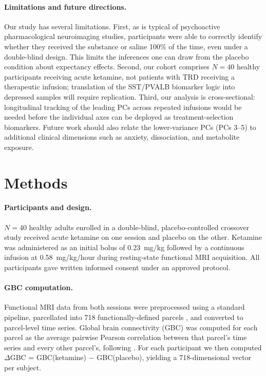 \documentclass[11pt]{article}
\begin{document}
\paragraph{Limitations and future directions.} Our study has several
limitations. First, as is typical of psychoactive pharmacological
neuroimaging studies, participants were able to correctly identify whether
they received the substance or saline 100\% of the time, even under a
double-blind design. This limits the inferences one can draw from the
placebo condition about expectancy effects. Second, our cohort comprises
$N=40$ healthy participants receiving acute ketamine, not patients with
TRD receiving a therapeutic infusion; translation of the SST/PVALB
biomarker logic into depressed samples will require replication. Third,
our analysis is cross-sectional: longitudinal tracking of the leading PCs
across repeated infusions would be needed before the individual axes can
be deployed as treatment-selection biomarkers. Future work should also
relate the lower-variance PCs (PCs 3--5) to additional clinical dimensions
such as anxiety, dissociation, and metabolite exposure.

\section{Methods}

\paragraph{Participants and design.} $N=40$ healthy adults enrolled in a
double-blind, placebo-controlled crossover study received acute ketamine
on one session and placebo on the other. Ketamine was administered as an
initial bolus of 0.23~mg/kg followed by a continuous infusion at
0.58~mg/kg/hour during resting-state functional MRI acquisition. All
participants gave written informed consent under an approved protocol.

\paragraph{GBC computation.} Functional MRI data from both sessions were
preprocessed using a standard pipeline, parcellated into 718
functionally-defined parcels \citep{glasser2016multi,ji2019mapping}, and
converted to parcel-level time series. Global brain connectivity (GBC) was
computed for each parcel as the average pairwise Pearson correlation
between that parcel's time series and every other parcel's, following
\citet{cole2010globalbrain}. For each participant we then computed
$\Delta$GBC = GBC(ketamine) $-$ GBC(placebo), yielding a 718-dimensional
vector per subject.
\end{document}
